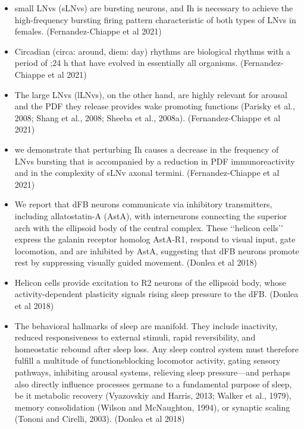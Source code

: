 \documentclass[11pt]{article}
\begin{document}
\begin{itemize}
    \item small LNvs (sLNvs) are bursting neurons, and Ih is necessary to achieve the high-frequency bursting firing pattern
    characteristic of both types of LNvs in females.
    \cite{fernandez-chiappeHighFrequencyNeuronalBursting2021} (Fernandez-Chiappe et al 2021)

    \item Circadian (circa: around, diem: day) rhythms are biological rhythms with a period of ;24 h that have evolved in essentially all organisms.
    \cite{fernandez-chiappeHighFrequencyNeuronalBursting2021} (Fernandez-Chiappe et al 2021)

    \item The large LNvs (lLNvs), on the other hand, are highly relevant for arousal and the PDF they release provides wake promoting functions (Parisky et al., 2008; Shang et al., 2008; Sheeba et al., 2008a).
    \cite{fernandez-chiappeHighFrequencyNeuronalBursting2021} (Fernandez-Chiappe et al 2021)

    \item we demonstrate that perturbing Ih causes a decrease in the frequency of LNvs bursting that is accompanied by a reduction in PDF immunoreactivity and in the complexity of sLNv axonal termini.
    \cite{fernandez-chiappeHighFrequencyNeuronalBursting2021} (Fernandez-Chiappe et al 2021)

    \item We report that dFB neurons communicate via inhibitory transmitters, including allatostatin-A (AstA), with interneurons connecting the superior arch with the ellipsoid body of the central complex. These ‘‘helicon cells’’ express the galanin receptor homolog AstA-R1, respond to visual input, gate locomotion, and are inhibited by AstA, suggesting that dFB neurons promote rest by suppressing visually guided movement.
    \cite{donleaRecurrentCircuitryBalancing2018} (Donlea et al 2018)

    \item Helicon cells provide excitation to R2 neurons of the ellipsoid body, whose activity-dependent plasticity signals rising sleep pressure to the dFB.
    \cite{donleaRecurrentCircuitryBalancing2018} (Donlea et al 2018)

    \item The behavioral hallmarks of sleep are manifold. They include inactivity, reduced responsiveness to external stimuli, rapid reversibility, and homeostatic rebound after sleep loss. Any sleep control system must therefore fulfill a multitude of functionsblocking locomotor activity, gating sensory pathways, inhibiting arousal systems, relieving sleep pressure—and perhaps also directly influence processes germane to a fundamental purpose of sleep, be it metabolic recovery (Vyazovskiy and Harris, 2013; Walker et al., 1979), memory consolidation (Wilson and McNaughton, 1994), or synaptic scaling (Tononi and Cirelli, 2003).
    \cite{donleaRecurrentCircuitryBalancing2018} (Donlea et al 2018)


\end{itemize}
\end{document}
